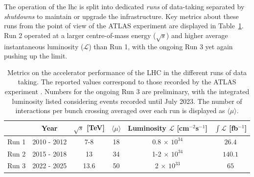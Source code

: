 The operation of the \gls{lhc} is split into dedicated \textit{runs} of data-taking separated by \textit{shutdowns} to maintain or upgrade the infrastructure. Key metrics about these runs from the point of view of the ATLAS experiment are displayed in Table~\ref{tbl:LHCATLASperf}. Run 2 operated at a larger centre-of-mass energy ($\sqrt{s}$) and higher average instantaneous luminosity ($\mathcal{L}$) than Run 1, with the ongoing Run 3 yet again pushing up the limit.\\

{
\vspace{-1cm}
\begin{table}[!htbp]
  \begin{center}
      \renewcommand{\arraystretch}{1.2}
      \begin{tabular}{cc|cccc} \hline \hline 
        & Year & $\sqrt{s}$ [TeV] & $\langle \mu \rangle$ &  Luminosity $\mathcal{L}$ [cm$^{-2}$s$^{-1}$] & $\int\mathcal{L}$ [fb$^{-1}$] \\ \hline
        Run 1 & 2010 - 2012 & 7-8    & 18 & 0.8 $\times$ $10^{34}$    & $26.4$ \\
        Run 2 & 2015 - 2018 & 13     & 34 & 1-2 $\times$ $10^{34}$  & $140.1$ \\
        Run 3 & 2022 - 2025 & 13.6     & 50 & 2 $\times$ $10^{33}$    & $65$ \\

        \hline\hline
      \end{tabular}
    \caption{Metrics on the accelerator performance of the LHC in the different runs of data taking. The reported values correspond to those recorded by the ATLAS experiment \cite{ATLAS:run1Lumi, ATLAS:2022hro, ATL-DAPR-PUB-2023-001}. Numbers for the ongoing Run 3 are preliminary, with the integrated luminosity listed considering events recorded until July 2023. The number of interactions per bunch crossing averaged over each run is displayed as $\langle \mu \rangle$.}
    \label{tbl:LHCATLASperf}
  \end{center}
\end{table}
}

